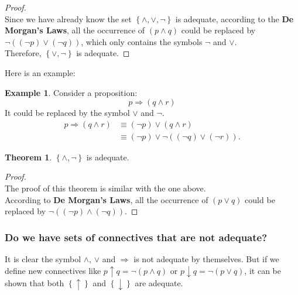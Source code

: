 \documentclass[11pt]{article}
\theoremstyle{definition}
\newtheorem{theorem}{Theorem}[subsection]
\newtheorem{eg}{Example}[subsection]
\begin{document}
\begin{proof}
    \quad \\
    Since we have already know the set $\left\{ \wedge,\vee,\neg \right\}$ is adequate, according to the \textbf{De Morgan's Laws}, all the occurrence of $(p \wedge q)$ could be replaced by $\neg ((\neg p) \vee (\neg q))$, which only contains the symbols $\neg$ and $\vee$.\\
    Therefore, $\left\{ \vee, \neg \right\}$ is adequate.
\end{proof}

Here is an example:
\begin{eg}
    Consider a proposition:
    \begin{equation}
        p \Rightarrow (q \wedge r)
    \end{equation}
    It could be replaced by the symbol $\vee$ and $\neg$.
    \begin{equation}
        \begin{split}
            p \Rightarrow (q \wedge r) & \equiv (\neg p) \vee (q \wedge r)\\
                                       & \equiv (\neg p) \vee \neg ((\neg q) \vee (\neg r)).
        \end{split}
    \end{equation}
\end{eg}

\begin{shaded}
    \begin{theorem}
        $\left\{ \wedge, \neg \right\}$ is adequate.
    \end{theorem}
\end{shaded}

\begin{proof}
    \quad \\
    The proof of this theorem is similar with the one above.\\
    According to \textbf{De Morgan's Laws}, all the occurrence of $(p \vee q)$ could be replaced by $\neg ((\neg p) \wedge (\neg q))$.
\end{proof}

\subsubsection{Do we have sets of connectives that are not adequate?}
It is clear the symbol $\wedge$, $\vee$ and $\Rightarrow$ is not adequate by themselves. But if we define new connectives like $p \uparrow q = \neg (p \wedge q)$ or $p \downarrow q = \neg (p \vee q)$, it can be shown that both $\left\{ \uparrow \right\}$ and $\left\{ \downarrow \right\}$ are adequate.
\end{document}
